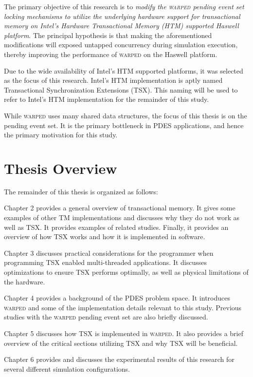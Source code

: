 \documentclass[11pt]{book}
\begin{document}
The primary objective of this research is to \emph{modify the \textsc{warped} pending
  event set locking mechanisms to utilize the underlying hardware support for
  transactional memory on Intel's Hardware Transactional Memory (HTM) supported Haswell
  platform}.  The principal hypothesis is that making the aforementioned modifications
will exposed untapped concurrency during simulation execution, thereby improving the
performance of \textsc{warped} on the Haswell platform.

Due to the wide availability of Intel's HTM supported platforms, it was selected as the
focus of this research.  Intel's HTM implementation is aptly named Transactional
Synchronization Extensions (TSX).  This naming will be used to refer to Intel's HTM
implementation for the remainder of this study.

While \textsc{warped} uses many shared data structures, the focus of this thesis is on the
pending event set.  It is the primary bottleneck in PDES applications, and hence the
primary motivation for this study.

\section{Thesis Overview}

The remainder of this thesis is organized as follows:

Chapter 2 provides a general overview of transactional memory.  It gives some examples of
other TM implementations and discusses why they do not work as well as TSX.  It provides
examples of related studies.  Finally, it provides an overview of how TSX works and how it
is implemented in software.

Chapter 3 discusses practical considerations for the programmer when programming TSX
enabled multi-threaded applications.  It discusses optimizations to ensure TSX performs
optimally, as well as physical limitations of the hardware.

Chapter 4 provides a background of the PDES problem space.  It introduces \textsc{warped}
and some of the implementation details relevant to this study.  Previous studies with the
\textsc{warped} pending event set are also briefly discussed.

Chapter 5 discusses how TSX is implemented in \textsc{warped}.  It also provides a brief
overview of the critical sections utilizing TSX and why TSX will be beneficial.

Chapter 6 provides and discusses the experimental results of this research for several
different simulation configurations.
\end{document}
